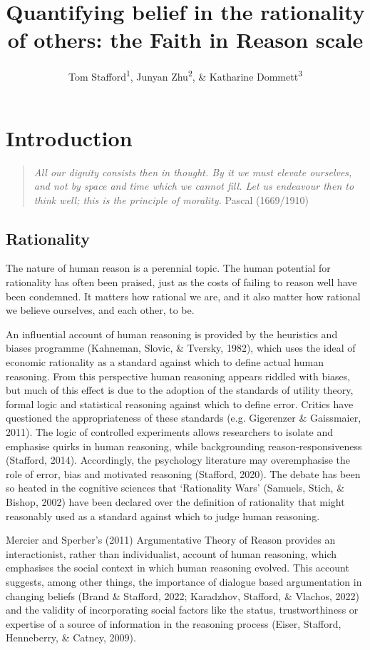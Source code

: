 \documentclass[
  ,jou,floatsintext]{apa6}
\title{Quantifying belief in the rationality of others: the Faith in Reason scale}
\author{Tom Stafford\textsuperscript{1}, Junyan Zhu\textsuperscript{2}, \& Katharine Dommett\textsuperscript{3}}
\date{}
\affiliation{\vspace{0.5cm}\textsuperscript{1} Department of Psychology, University of Sheffield, UK\\\textsuperscript{2} Munk School of Global Affairs and Public Policy, University of Toronto, Canada\\\textsuperscript{3} Department of Politics and International Relations, University of Sheffield, UK}
\begin{document}
\maketitle

\hypertarget{introduction}{%
\section{Introduction}\label{introduction}}

\begin{quote}
\emph{All our dignity consists then in thought. By it we must elevate ourselves, and not by space and time which we cannot fill. Let us endeavour then to think well; this is the principle of morality.}
Pascal (1669/1910)
\end{quote}

\hypertarget{rationality}{%
\subsection{Rationality}\label{rationality}}

The nature of human reason is a perennial topic. The human potential for rationality has often been praised, just as the costs of failing to reason well have been condemned. It matters how rational we are, and it also matter how rational we believe ourselves, and each other, to be.

An influential account of human reasoning is provided by the heuristics and biases programme (Kahneman, Slovic, \& Tversky, 1982), which uses the ideal of economic rationality as a standard against which to define actual human reasoning. From this perspective human reasoning appears riddled with biases, but much of this effect is due to the adoption of the standards of utility theory, formal logic and statistical reasoning against which to define error. Critics have questioned the appropriateness of these standards (e.g. Gigerenzer \& Gaissmaier, 2011). The logic of controlled experiments allows researchers to isolate and emphasise quirks in human reasoning, while backgrounding reason-responsiveness (Stafford, 2014). Accordingly, the psychology literature may overemphasise the role of error, bias and motivated reasoning (Stafford, 2020). The debate has been so heated in the cognitive sciences that `Rationality Wars' (Samuels, Stich, \& Bishop, 2002) have been declared over the definition of rationality that might reasonably used as a standard against which to judge human reasoning.

Mercier and Sperber's (2011) Argumentative Theory of Reason provides an interactionist, rather than individualist, account of human reasoning, which emphasises the social context in which human reasoning evolved. This account suggests, among other things, the importance of dialogue based argumentation in changing beliefs (Brand \& Stafford, 2022; Karadzhov, Stafford, \& Vlachos, 2022) and the validity of incorporating social factors like the status, trustworthiness or expertise of a source of information in the reasoning process (Eiser, Stafford, Henneberry, \& Catney, 2009).
\end{document}
